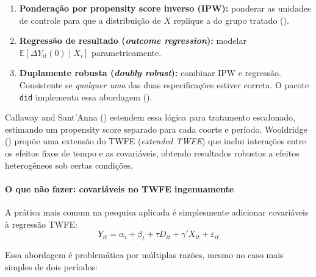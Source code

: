 \documentclass[
]{article}
\providecommand{\tightlist}{%
  \setlength{\itemsep}{0pt}\setlength{\parskip}{0pt}}
\begin{document}
\begin{enumerate}
\def\labelenumi{\arabic{enumi}.}
\tightlist
\item
  \textbf{Ponderação por propensity score inverso (IPW):} ponderar as unidades de controle para que a distribuição de \(X\) replique a do grupo tratado ().
\item
  \textbf{Regressão de resultado (\emph{outcome regression}):} modelar \(\mathbb{E}[\Delta Y_{it}(0) \mid X_i]\) parametricamente.
\item
  \textbf{Duplamente robusta (\emph{doubly robust}):} combinar IPW e regressão. Consistente se \emph{qualquer uma} das duas especificações estiver correta. O pacote \texttt{did} implementa essa abordagem ().
\end{enumerate}

Callaway and Sant'Anna () estendem essa lógica para tratamento escalonado, estimando um propensity score separado para cada coorte e período. Wooldridge () propõe uma extensão do TWFE (\emph{extended TWFE}) que inclui interações entre os efeitos fixos de tempo e as covariáveis, obtendo resultados robustos a efeitos heterogêneos sob certas condições.

\paragraph{O que não fazer: covariáveis no TWFE ingenuamente}\label{o-que-nuxe3o-fazer-covariuxe1veis-no-twfe-ingenuamente}

A prática mais comum na pesquisa aplicada é simplesmente adicionar covariáveis à regressão TWFE:
\[
Y_{it} = \alpha_i + \beta_t + \tau D_{it} + \gamma' X_{it} + \varepsilon_{it}
\]

Essa abordagem é problemática por múltiplas razões, mesmo no caso mais simples de dois períodos:
\end{document}
